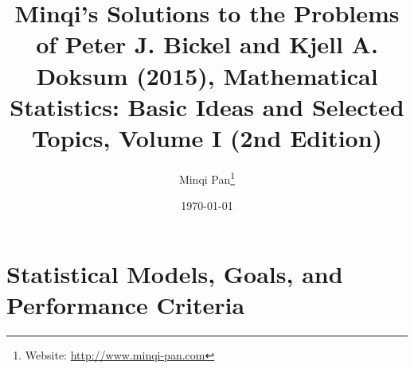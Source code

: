 \documentclass{amsbook}
\theoremstyle{definition}
\theoremstyle{remark}
\numberwithin{section}{chapter}
\numberwithin{equation}{chapter}
\begin{document}
\frontmatter

\title{Minqi's Solutions to the Problems of Peter J. Bickel and Kjell A. Doksum (2015), Mathematical Statistics: Basic Ideas and Selected Topics, Volume I (2nd Edition)}

\author{Minqi Pan\footnote{Website: \href{http://www.minqi-pan.com}{http://www.minqi-pan.com}}}

\date{\today}

\maketitle

\setcounter{page}{4}

\tableofcontents

\mainmatter

\chapter{Statistical Models, Goals, and Performance Criteria}
\end{document}
